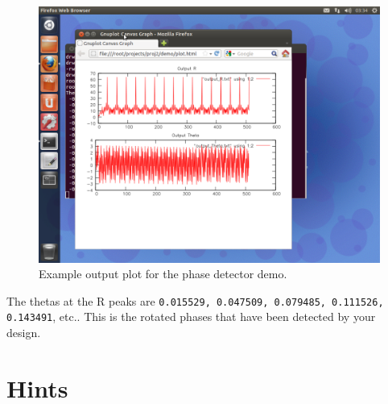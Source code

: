 \begin{figure}
\centering
%
\includegraphics[width=6in]{images/phase_detector_demo}
\caption{Example output plot for the phase detector demo.}
\label{fig:phase_detector_demo}
\end{figure}

The thetas at the R peaks are \texttt{0.015529, 0.047509, 0.079485, 0.111526, 0.143491}, etc.. This is the rotated phases that have been detected by your design.

\section{Hints}

